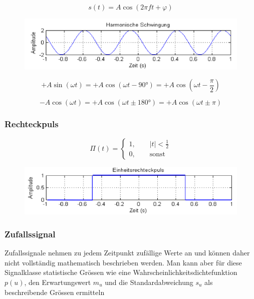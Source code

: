 \documentclass[
  10pt,
  a4paper,
  german]{article}
\numberwithin{equation}{section}
\begin{document}
\[
s(t)=A\cos(2\pi ft+\varphi)
\]

\begin{figure}[H]

{\centering \includegraphics{images/02_HarmonischeSchwingung.png}

}

\end{figure}

\[
+A\sin(\omega t)=+A\cos(\omega t-90°)=+A\cos\left(\omega t -\frac{\pi}{2}\right)
\]

\[
-A\cos(\omega t)=+A\cos(\omega t\pm 180°)=+A\cos(\omega t\pm\pi)
\]

\hypertarget{rechteckpuls}{%
\subsubsection{Rechteckpuls}\label{rechteckpuls}}

\[
\Pi(t)=
\begin{cases}
   1,\qquad|t|<\frac12\\
   0,\qquad\text{sonst}
\end{cases}
\]

\begin{figure}[H]

{\centering \includegraphics{images/02_Einheitsrechteckimpuls.png}

}

\end{figure}

\hypertarget{zufallssignal}{%
\subsubsection{Zufallssignal}\label{zufallssignal}}

Zufallssignale nehmen zu jedem Zeitpunkt zufällige Werte an und können
daher nicht vollständig mathematisch beschrieben werden. Man kann aber
für diese Signalklasse statistische Grössen wie eine
Wahrscheinlichkeitsdichtefunktion \(p(u)\), den Erwartungswert \(m_u\)
und die Standardabweichung \(s_u\) als beschreibende Grössen ermitteln
\end{document}
